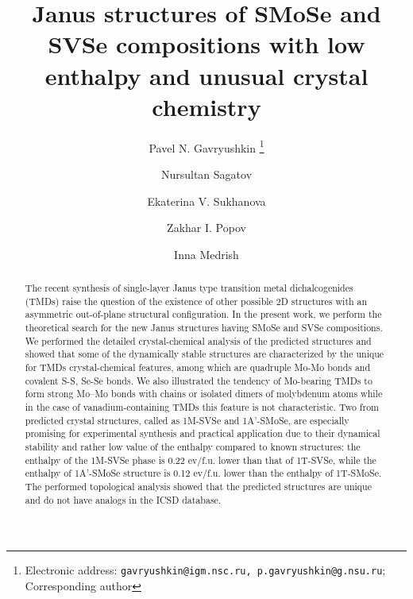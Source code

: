 \documentclass[a4paperm]{article}
\begin{document}

\title{Janus structures of SMoSe and SVSe compositions with low enthalpy and unusual crystal chemistry}



\author[1,2,3]{Pavel N. Gavryushkin
   \thanks{Electronic address: \texttt{gavryushkin@igm.nsc.ru, p.gavryushkin@g.nsu.ru}; Corresponding author}}     
\author[2]{Nursultan Sagatov}
\author[1]{Ekaterina V. Sukhanova}
\author[1]{Zakhar I. Popov}
\author[4]{Inna Medrish}



\date{}
\maketitle


\begin{abstract}
The recent synthesis of single-layer Janus type transition metal dichalcogenides (TMDs) raise the question of the existence of other possible 2D structures with an asymmetric out-of-plane structural configuration.
In the present work, we perform the theoretical search for the new Janus structures having SMoSe and SVSe compositions. We performed the detailed crystal-chemical analysis of the predicted structures and showed that some of the dynamically stable structures are characterized by the unique for TMDs crystal-chemical features, among which are quadruple Mo-Mo bonds and covalent S-S, Se-Se bonds. We also illustrated the tendency of Mo-bearing TMDs to form strong Mo--Mo bonds with chains or isolated dimers of molybdenum atoms while in the case of vanadium-containing TMDs this feature is not characteristic. Two from predicted crystal structures, called as 1M-SVSe and 1A'-SMoSe, are especially promising for experimental synthesis and practical application due to their dynamical stability and rather low value of the enthalpy compared to known structures: the enthalpy of the 1M-SVSe phase is 0.22 ev/f.u. lower than that of 1T-SVSe, while the enthalpy of 1A'-SMoSe structure is 0.12 ev/f.u. lower than the enthalpy of 1T-SMoSe. The performed topological analysis showed that the predicted structures are unique and do not have analogs in the ICSD database.
\end{abstract}
\end{document}
